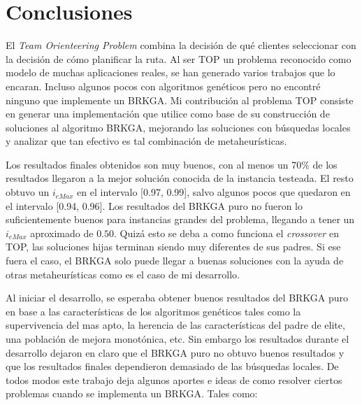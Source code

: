 \chapter{Conclusiones}

\bigskip

El \textit{Team Orienteering Problem} combina la decisión de qué clientes seleccionar con la decisión de cómo planificar la ruta. Al ser TOP un problema reconocido como modelo de muchas aplicaciones reales, se han generado varios trabajos que lo encaran. Incluso algunos pocos con algoritmos genéticos pero no encontré ninguno que implemente un BRKGA. Mi contribución al problema TOP consiste en generar una implementación que utilice como base de su construcción de soluciones al algoritmo BRKGA, mejorando las soluciones con búsquedas locales y analizar que tan efectivo es tal combinación de metaheurísticas.

\bigskip

Los resultados finales obtenidos son muy buenos, con al menos un 70\% de los resultados llegaron a la mejor solución conocida de la instancia testeada. El resto obtuvo un $i_{eMax}$ en el intervalo [0.97, 0.99], salvo algunos pocos que quedaron en el intervalo [0.94, 0.96]. Los resultados del BRKGA puro no fueron lo suficientemente buenos para instancias grandes del problema, llegando a tener un $i_{eMax}$ aproximado de $0.50$. Quizá esto se deba a como funciona el \textit{crossover} en TOP, las soluciones hijas terminan siendo muy diferentes de sus padres. Si ese fuera el caso, el BRKGA solo puede llegar a buenas soluciones con la ayuda de otras metaheurísticas como es el caso de mi desarrollo.

\bigskip

Al iniciar el desarrollo, se esperaba obtener buenos resultados del BRKGA puro en base a las características de los algoritmos genéticos tales como la supervivencia del mas apto, la herencia de las características del padre de elite, una población de mejora monotónica, etc. Sin embargo los resultados durante el desarrollo dejaron en claro que el BRKGA puro no obtuvo buenos resultados y que los resultados finales dependieron demasiado de las búsquedas locales. De todos modos este trabajo deja algunos aportes e ideas de como resolver ciertos problemas cuando se implementa un BRKGA. Tales como:

\bigskip

